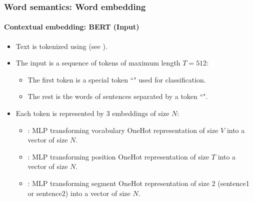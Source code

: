 \documentclass[xcolor=table]{beamer}
\begin{document}
\begin{frame}
\frametitle{Word semantics: Word embedding}
\framesubtitle{Contextual embedding: BERT (Input)}

\begin{itemize}
	\item Text is tokenized using  (see \cite{2016-wu-al}).
	\item The input is a sequence of tokens of maximum length $T = 512$:
	\begin{itemize}
		\item The first token is a special token ``\keyword{[CLS]}" used for classification.
		\item The rest is the words of sentences separated by a token ``\keyword{[SEP]}".
	\end{itemize}
	\item Each token is represented by 3 embeddings of size $N$:
	\begin{itemize}
		\item {}: MLP transforming vocabulary OneHot representation of size $V$ into a vector of size $N$.
		\item {}: MLP transforming position OneHot representation of size $T$ into a vector of size $N$.
		\item {}: MLP transforming segment OneHot representation of size $2$ (sentence1 or sentence2) into a vector of size $N$.
	\end{itemize}
\end{itemize}
	
\end{frame}
\end{document}
